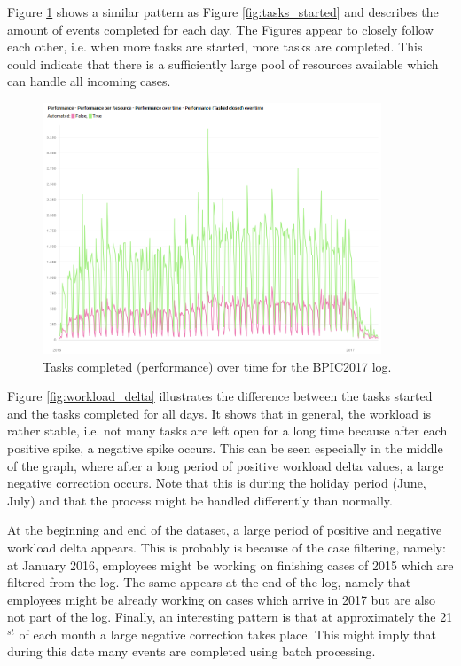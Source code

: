 Figure \ref{fig:performance} shows a similar pattern as Figure \ref{fig:tasks_started} and describes the amount of events completed for each day. The Figures appear to closely follow each other, i.e. when more tasks are started, more tasks are completed. This could indicate that there is a sufficiently large pool of resources available which can handle all incoming cases. 

\begin{figure}[h]
	\centering
    \includegraphics[width=0.9\textwidth]{figures/performance.png}
    \caption{Tasks completed (performance) over time for the BPIC2017 log.}
    \label{fig:performance}
\end{figure}

Figure \ref{fig:workload_delta} illustrates the difference between the tasks started and the tasks completed for all days. It shows that in general, the workload is rather stable, i.e. not many tasks are left open for a long time because after each positive spike, a negative spike occurs. This can be seen especially in the middle of the graph, where after a long period of positive workload delta values, a large negative correction occurs. Note that this is during the holiday period (June, July) and that the process might be handled differently than normally. 

At the beginning and end of the dataset, a large period of positive and negative workload delta appears. This is probably is because of the case filtering, namely: at January 2016, employees might be working on finishing cases of 2015 which are filtered from the log. The same appears at the end of the log, namely that employees might be already working on cases which arrive in 2017 but are also not part of the log. Finally, an interesting pattern is that at approximately the 21$^{st}$ of each month a large negative correction takes place. This might imply that during this date many events are completed using batch processing. 


